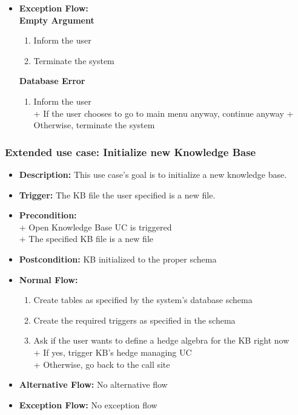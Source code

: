 \documentclass[../gr-final.tex]{subfiles}
\begin{document}
\begin{itemize}
  \item {\bfseries Exception Flow:}\\
    {\bfseries Empty Argument}
    \begin{enumerate}
      \item Inform the user
      \item Terminate the system
    \end{enumerate}

    {\bfseries Database Error}
    \begin{enumerate}
      \item Inform the user\\
        \indent + If the user chooses to go to main menu anyway,
          continue anyway
        \indent + Otherwise, terminate the system      
    \end{enumerate}

\end{itemize}

\subsubsection{Extended use case: Initialize new Knowledge Base}
\begin{itemize}
  \item {\bfseries Description:} This use case's goal is to
    initialize a new knowledge base.
  \item {\bfseries Trigger:} The KB file the user specified is a
    new file.
  \item {\bfseries Precondition:} \\
    \indent + Open Knowledge Base UC is triggered\\
    \indent + The specified KB file is a new file
  \item {\bfseries Postcondition:} KB initialized to the proper
    schema    
  \item {\bfseries Normal Flow:}
    \begin{enumerate}
      \item Create tables as specified by the system's database
        schema
      \item Create the required triggers as specified in the
        schema
      \item Ask if the user wants to define a hedge algebra for
        the KB right now\\
        \indent + If yes, trigger KB's hedge managing UC\\
        \indent + Otherwise, go back to the call site
    \end{enumerate}
  \item {\bfseries Alternative Flow:} No alternative flow
  \item {\bfseries Exception Flow:} No exception flow
\end{itemize}
\end{document}

